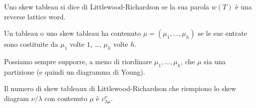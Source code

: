 \begin{defn}
Uno skew tableau si dice di Littlewood-Richardson se la sua parola
$w(T)$ \`e una reverse lattice word.
\end{defn}

\begin{defn}
Un tableau o uno skew tableau ha contenuto $\mu = (\mu_1, \ldots,
\mu_h)$ se le sue entrate sono costituite da $\mu_1$ volte $1$,
\ldots, $\mu_h$ volte $h$.
\end{defn}

\begin{oss}
Possiamo sempre supporre, a meno di riordinare $\mu_1, \ldots,\mu_h$,
che $\mu$ sia una partizione (e quindi un diagramma di Young).
\end{oss}

\begin{prop}
Il numero di skew tableaux di Littlewood-Richardson che riempiono lo
skew diagram $\nu/\lambda$ con contenuto $\mu$ \`e $c_{\lambda \mu}^{\nu}$.
\end{prop}
